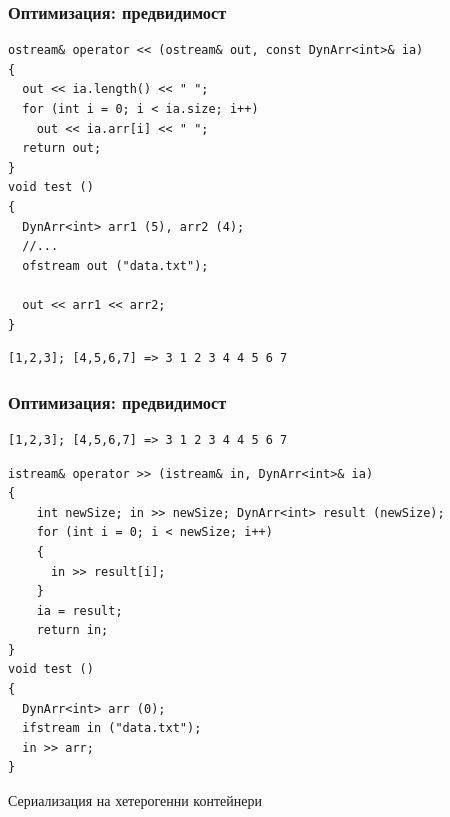 \documentclass{beamer}
\begin{document}
\begin{frame}[fragile]
\frametitle{Оптимизация: предвидимост}


\begin{flushleft}
\begin{lstlisting}
ostream& operator << (ostream& out, const DynArr<int>& ia)
{
  out << ia.length() << " ";
  for (int i = 0; i < ia.size; i++)
    out << ia.arr[i] << " ";
  return out;
}
void test ()
{
  DynArr<int> arr1 (5), arr2 (4);
  //...
  ofstream out ("data.txt");

  out << arr1 << arr2;
}
\end{lstlisting}  
\end{flushleft}

\begin{lstlisting}
[1,2,3]; [4,5,6,7] => 3 1 2 3 4 4 5 6 7
\end{lstlisting}  

\end{frame}




\begin{frame}[fragile]
\frametitle{Оптимизация: предвидимост}

\begin{lstlisting}
[1,2,3]; [4,5,6,7] => 3 1 2 3 4 4 5 6 7
\end{lstlisting}  

\begin{flushleft}
\begin{lstlisting}
istream& operator >> (istream& in, DynArr<int>& ia)
{
    int newSize; in >> newSize; DynArr<int> result (newSize);
    for (int i = 0; i < newSize; i++)
    {
      in >> result[i];
    }
    ia = result;
    return in;
}
void test ()
{
  DynArr<int> arr (0);
  ifstream in ("data.txt");
  in >> arr;
}
\end{lstlisting}  
\end{flushleft}


\end{frame}


\begin{frame}
\centerline{Сериализация на хетерогенни контейнери}
\end{frame}
\end{document}
